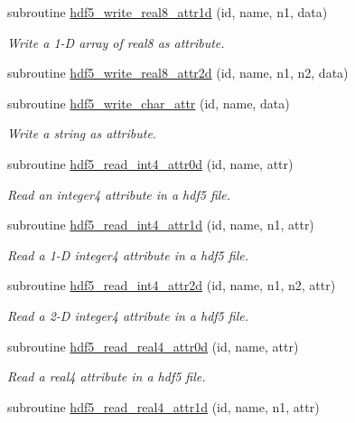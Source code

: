\begin{DoxyCompactItemize}
subroutine \hyperlink{classmodhdf5_ad55b7cffc861305840d5f160ba6fa1fd}{hdf5\-\_\-write\-\_\-real8\-\_\-attr1d} (id, name, n1, data)
\begin{DoxyCompactList}\small\item\em Write a 1-\/\-D array of real8 as attribute. \end{DoxyCompactList}\item 
subroutine \hyperlink{classmodhdf5_a71ef9213132fb3f757d29f58f9c20966}{hdf5\-\_\-write\-\_\-real8\-\_\-attr2d} (id, name, n1, n2, data)
\item 
subroutine \hyperlink{classmodhdf5_ad6fea34611cf76b56b5143cd182b8484}{hdf5\-\_\-write\-\_\-char\-\_\-attr} (id, name, data)
\begin{DoxyCompactList}\small\item\em Write a string as attribute. \end{DoxyCompactList}\item 
subroutine \hyperlink{classmodhdf5_a10a4b5212d77e52dba2616ba3abb7df1}{hdf5\-\_\-read\-\_\-int4\-\_\-attr0d} (id, name, attr)
\begin{DoxyCompactList}\small\item\em Read an integer4 attribute in a hdf5 file. \end{DoxyCompactList}\item 
subroutine \hyperlink{classmodhdf5_a2ff1b28dd896cc37583e97a52348039f}{hdf5\-\_\-read\-\_\-int4\-\_\-attr1d} (id, name, n1, attr)
\begin{DoxyCompactList}\small\item\em Read a 1-\/\-D integer4 attribute in a hdf5 file. \end{DoxyCompactList}\item 
subroutine \hyperlink{classmodhdf5_a4ca8f47995bf9df5b6c892781c87dd95}{hdf5\-\_\-read\-\_\-int4\-\_\-attr2d} (id, name, n1, n2, attr)
\begin{DoxyCompactList}\small\item\em Read a 2-\/\-D integer4 attribute in a hdf5 file. \end{DoxyCompactList}\item 
subroutine \hyperlink{classmodhdf5_a6cf3b8369d7cbc96e8639439eb7c51ff}{hdf5\-\_\-read\-\_\-real4\-\_\-attr0d} (id, name, attr)
\begin{DoxyCompactList}\small\item\em Read a real4 attribute in a hdf5 file. \end{DoxyCompactList}\item 
subroutine \hyperlink{classmodhdf5_acd7e7ad91ecc73c632ddc76468dbd083}{hdf5\-\_\-read\-\_\-real4\-\_\-attr1d} (id, name, n1, attr)

\end{DoxyCompactItemize}
